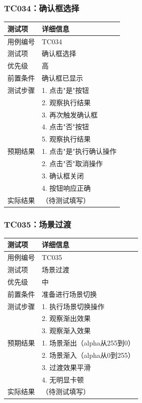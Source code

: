 \documentclass[a4paper,12pt]{article}
\begin{document}
\subsubsection{TC034：确认框选择}
\begin{table}[h]
\centering
\begin{tabular}{ll}
\toprule
测试项 & 详细信息 \\
\midrule
用例编号 & TC034 \\
测试项 & 确认框选择 \\
优先级 & 高 \\
前置条件 & 确认框已显示 \\
测试步骤 & 1. 点击"是"按钮 \\
 & 2. 观察执行结果 \\
 & 3. 再次触发确认框 \\
 & 4. 点击"否"按钮 \\
 & 5. 观察执行结果 \\
预期结果 & 1. 点击"是"执行确认操作 \\
 & 2. 点击"否"取消操作 \\
 & 3. 确认框关闭 \\
 & 4. 按钮响应正确 \\
实际结果 & （待测试填写） \\
\bottomrule
\end{tabular}
\end{table}

\subsubsection{TC035：场景过渡}
\begin{table}[h]
\centering
\begin{tabular}{ll}
\toprule
测试项 & 详细信息 \\
\midrule
用例编号 & TC035 \\
测试项 & 场景过渡 \\
优先级 & 中 \\
前置条件 & 准备进行场景切换 \\
测试步骤 & 1. 执行场景切换操作 \\
 & 2. 观察渐出效果 \\
 & 3. 观察渐入效果 \\
预期结果 & 1. 场景渐出（alpha从255到0） \\
 & 2. 场景渐入（alpha从0到255） \\
 & 3. 过渡效果平滑 \\
 & 4. 无明显卡顿 \\
实际结果 & （待测试填写） \\
\bottomrule
\end{tabular}
\end{table}
\end{document}
